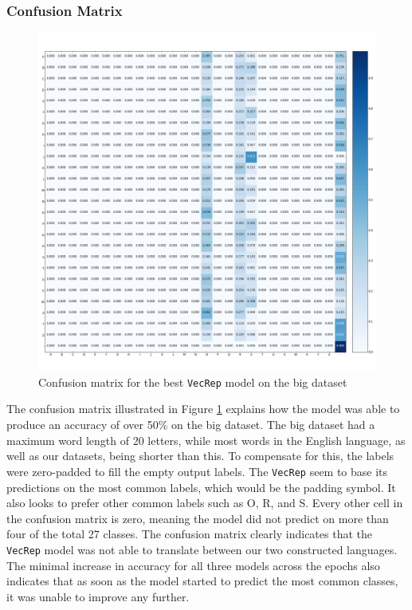 \subsubsection{Confusion Matrix}
\begin{figure}[H]
    \centering
    \includegraphics[width=1\textwidth]{fig/results/experiment1/big/vecrep/confusion_matrix.png}
    \caption{Confusion matrix for the best {\tt VecRep} model on the big dataset}
    \label{fig:result1_big_vecrep_confusion_matrix}
\end{figure}

The confusion matrix illustrated in Figure \ref{fig:result1_big_vecrep_confusion_matrix} explains how the model was able to produce an accuracy of over 50\% on the big dataset. The big dataset had a maximum word length of 20 letters, while most words in the English language, as well as our datasets, being shorter than this. To compensate for this, the labels were zero-padded to fill the empty output labels. The {\tt VecRep} seem to base its predictions on the most common labels, which would be the padding symbol. It also looks to prefer other common labels such as O, R, and S. Every other cell in the confusion matrix is zero, meaning the model did not predict on more than four of the total 27 classes. The confusion matrix clearly indicates that the {\tt VecRep} model was not able to translate between our two constructed languages. The minimal increase in accuracy for all three models across the epochs also indicates that as soon as the model started to predict the most common classes, it was unable to improve any further.

